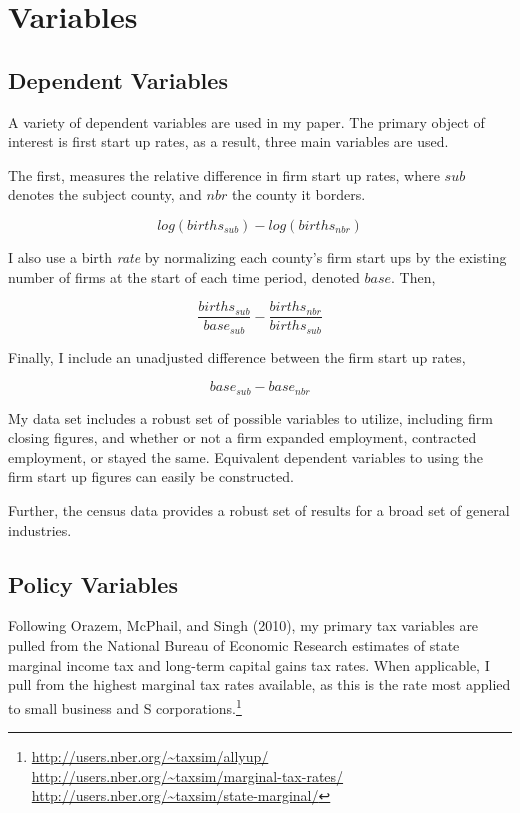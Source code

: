 \documentclass{article}
\begin{document}
\section{Variables}

\subsection{Dependent Variables}

A variety of dependent variables are used in my paper. The primary object of interest is first start up rates, as a result, three main variables are used.

The first, measures the relative difference in firm start up rates, where $sub$ denotes the subject county, and $nbr$ the county it borders.

$$log(births_{sub}) - log(births_{nbr})$$

I also use a birth \textit{rate} by normalizing each county's firm start ups by the existing number of firms at the start of each time period, denoted $base$. Then,

$$\frac{births_{sub}}{base_{sub}} - \frac{births_{nbr}}{births_{sub}}$$

Finally, I include an unadjusted difference between the firm start up rates,

$$base_{sub} - base_{nbr}$$

My data set includes a robust set of possible variables to utilize, including firm closing figures, and whether or not a firm expanded employment, contracted employment, or stayed the same. Equivalent dependent variables to using the firm start up figures can easily be constructed.

Further, the census data provides a robust set of results for a broad set of general industries.

\subsection{Policy Variables}

Following Orazem, McPhail, and Singh (2010), my primary tax variables are pulled from the National Bureau of Economic Research estimates of state marginal income tax and long-term capital gains tax rates. When applicable, I pull from the highest marginal tax rates available, as this is the rate most applied to small business and S corporations.\footnote{\url{http://users.nber.org/~taxsim/allyup/} \url{http://users.nber.org/~taxsim/marginal-tax-rates/} \url{http://users.nber.org/~taxsim/state-marginal/}}
\end{document}
